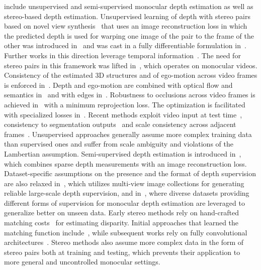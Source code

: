 \documentclass[final]{cvpr}
\newcommand{\PAR}[1]{\vskip2pt \noindent{\bf #1}}
\begin{document}
\PAR{Other depth estimation setups} include unsupervised and semi-supervised monocular depth estimation as well as stereo-based depth estimation. Unsupervised learning of depth with stereo pairs based on novel view synthesis~\cite{deepstereo} that uses an image reconstruction loss in which the predicted depth is used for warping one image of the pair to the frame of the other was introduced in~\cite{unsupervised:cnn:single:view:depth} and was cast in a fully differentiable formulation in~\cite{monodepth}.
Further works in this direction leverage temporal information~\cite{undemon,unsupervised:monocular:depth:and:odometry,recurrent:depth:estimation:from:monocular:video}. The need for stereo pairs in this framework was lifted in~\cite{unsupervised:depth:ego:motion:from:video}, which operates on monocular videos.
Consistency of the estimated 3D structures and of ego-motion across video frames is enforced in~\cite{unsupervised:depth:ego:motion:3d:geometric:constraints,neural:rgb2d:sensing,robust:consistent:video:depth:estimation}.
Depth and ego-motion are combined with optical flow and semantics in~\cite{geonet:unsupervised,self:supervised:monocular:depth:dynamic:object}
and with edges in~\cite{lego}.
Robustness to occlusions across video frames is achieved in~\cite{monodepth2} with a minimum reprojection loss. The optimization is facilitated with specialized losses in~\cite{feature:metric:loss:depth:egomotion,pladenet:self:supervised:depth}.
Recent methods exploit video input at test time~\cite{temporal:opportunist:depth}, consistency to segmentation outputs~\cite{edge:depth} and scale consistency across adjacent frames~\cite{scale:consistent:monocular:depth}.
Unsupervised approaches generally assume more complex training data than supervised ones and suffer from scale ambiguity and violations of the Lambertian assumption. Semi-supervised depth estimation is introduced in~\cite{semi:supervised:learning:monocular:depth}, which combines sparse depth measurements with an image reconstruction loss. Dataset-specific assumptions on the presence and the format of depth supervision are also relaxed in~\cite{megadepth}, which utilizes multi-view image collections for generating reliable large-scale depth supervision, and in~\cite{midas}, where diverse datasets providing different forms of supervision for monocular depth estimation are leveraged to generalize better on unseen data. 
Early stereo methods rely on hand-crafted matching costs~\cite{semiglobal:matching:stereo} for estimating disparity. Initial approaches that learned the matching function include~\cite{learning:the:matching:function,stereo:matching:convolutional:neural:network}, while subsequent works rely on fully convolutional architectures~\cite{dataset:disparity:optical:flow:scene:flow,psmnet}.
Stereo methods also assume more complex data in the form of stereo pairs both at training and testing, which prevents their application to more general and uncontrolled monocular settings.
\end{document}
